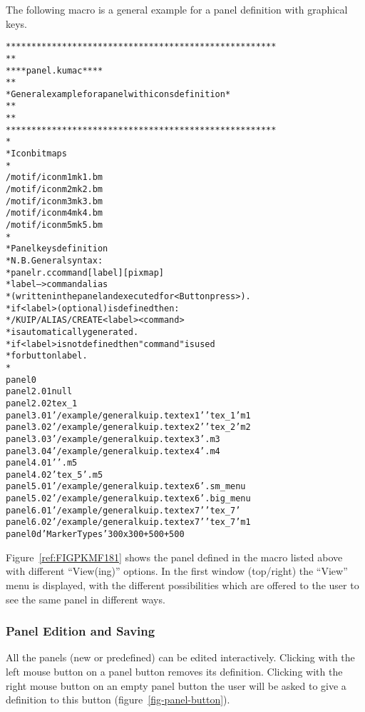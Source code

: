 The following macro is a general example for a panel
definition with graphical keys.

\begin{alltt}
*****************************************************
*                                                   *
*             *** panel.kumac ***                   *
*                                                   *
* General example for a panel with icons definition *
*                                                   *
*                                                   *
*****************************************************
*
* Icon bitmaps
*
/motif/icon m1 mk1.bm
/motif/icon m2 mk2.bm
/motif/icon m3 mk3.bm
/motif/icon m4 mk4.bm
/motif/icon m5 mk5.bm
*
* Panel keys definition
* N.B. General syntax:
*      panel r.c command [label] [pixmap]
*      label --> command alias
*                (written in the panel and executed for <Button press>).
*                if <label> (optional) is defined then:
*                   /KUIP/ALIAS/CREATE <label> <command>
*                is automatically generated.
*                if <label> is not defined then "command" is used
*                for button label.
*
panel 0
panel 2.01 null
panel 2.02 tex_1
panel 3.01 '/example/general kuip.tex tex 1' 'tex_1' m1
panel 3.02 '/example/general kuip.tex tex 2' 'tex_2' m2
panel 3.03 '/example/general kuip.tex tex 3' . m3
panel 3.04 '/example/general kuip.tex tex 4' . m4
panel 4.01 ' ' . m5
panel 4.02 'tex_5' . m5
panel 5.01 '/example/general kuip.tex tex 6' . sm_menu
panel 5.02 '/example/general kuip.tex tex 6' . big_menu
panel 6.01 '/example/general kuip.tex tex 7' 'tex_7'
panel 6.02 '/example/general kuip.tex tex 7' 'tex_7' m1
panel 0 d 'Marker Types' 300x300+500+500
\end{alltt}
 
Figure~\ref{ref:FIGPKMF181} shows the panel
defined in the macro listed above with different ``View(ing)'' options.
In the first window (top/right) the ``View'' menu is displayed,
with the different
possibilities which are offered to the user to see the same panel
in different ways.
 
 
\subsubsection{Panel Edition and Saving}
\label{ref:reedpanel}

All the panels (new or predefined) can be edited interactively.
Clicking with the left mouse button on a panel button removes its
definition.
Clicking with the right mouse button on an empty panel button the
user will be asked to give a definition to this button
(figure~\ref{fig-panel-button}).
 
